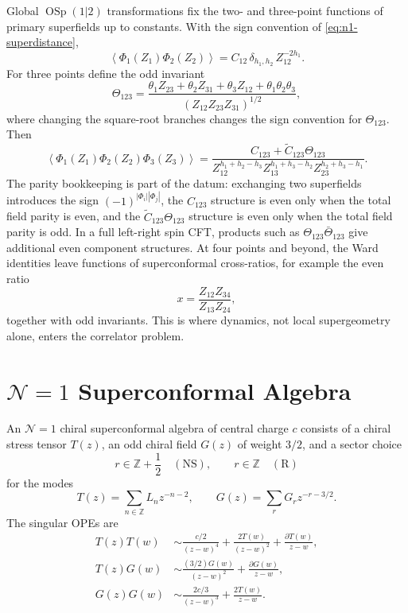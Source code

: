 Global \(\operatorname{OSp}(1|2)\) transformations fix the two- and
three-point functions of primary superfields up to constants.  With the sign
convention of \eqref{eq:n1-superdistance},
\begin{equation}
  \left\langle \Phi_1(Z_1)\Phi_2(Z_2)\right\rangle
  =
  C_{12}\,\delta_{h_1,h_2}\,Z_{12}^{-2h_1}.
  \label{eq:n1-superfield-two-point}
\end{equation}
For three points define the odd invariant
\begin{equation}
  \Theta_{123}
  =
  \frac{
    \theta_1 Z_{23}+\theta_2 Z_{31}+\theta_3 Z_{12}
    +\theta_1\theta_2\theta_3
  }{
    (Z_{12}Z_{23}Z_{31})^{1/2}
  },
  \label{eq:n1-three-point-odd-invariant}
\end{equation}
where changing the square-root branches changes the sign convention for
\(\Theta_{123}\).  Then
\begin{equation}
  \left\langle
    \Phi_1(Z_1)\Phi_2(Z_2)\Phi_3(Z_3)
  \right\rangle
  =
  \frac{
    C_{123}+\widetilde C_{123}\Theta_{123}
  }{
    Z_{12}^{h_1+h_2-h_3}
    Z_{13}^{h_1+h_3-h_2}
    Z_{23}^{h_2+h_3-h_1}
  }.
  \label{eq:n1-superfield-three-point}
\end{equation}
The parity bookkeeping is part of the datum: exchanging two superfields
introduces the sign \((-1)^{|\Phi_i||\Phi_j|}\), the \(C_{123}\) structure is
even only when the total field parity is even, and the
\(\widetilde C_{123}\Theta_{123}\) structure is even only when the total
field parity is odd.  In a full left-right spin CFT, products such as
\(\Theta_{123}\bar\Theta_{123}\) give additional even component structures.
At four points and beyond, the Ward identities leave functions of
superconformal cross-ratios, for example the even ratio
\[
  x=\frac{Z_{12}Z_{34}}{Z_{13}Z_{24}},
\]
together with odd invariants.  This is where dynamics, not local
supergeometry alone, enters the correlator problem.

\section{\texorpdfstring{\(\mathcal N=1\)}{N=1} Superconformal Algebra}

\begin{definition}[\(\mathcal N=1\) chiral superconformal algebra]
\label{def:n1-superconformal-algebra}
An \(\mathcal N=1\) chiral superconformal algebra of central charge \(c\)
consists of a chiral stress tensor \(T(z)\), an odd chiral field \(G(z)\) of
weight \(3/2\), and a sector choice
\[
  r\in\mathbb Z+\frac12\quad(\mathrm{NS}),\qquad
  r\in\mathbb Z\quad(\mathrm R)
\]
for the modes
\[
  T(z)=\sum_{n\in\mathbb Z}L_n z^{-n-2},
  \qquad
  G(z)=\sum_{r}G_r z^{-r-3/2}.
\]
The singular OPEs are
\begin{align}
  T(z)T(w)
  &\sim
  \frac{c/2}{(z-w)^4}
  +\frac{2T(w)}{(z-w)^2}
  +\frac{\partial T(w)}{z-w},
  \label{eq:n1-tt-ope}\\
  T(z)G(w)
  &\sim
  \frac{(3/2)G(w)}{(z-w)^2}
  +\frac{\partial G(w)}{z-w},
  \label{eq:n1-tg-ope}\\
  G(z)G(w)
  &\sim
  \frac{2c/3}{(z-w)^3}
  +\frac{2T(w)}{z-w}.
  \label{eq:n1-gg-ope}
\end{align}
\end{definition}

